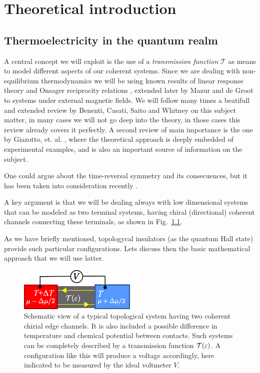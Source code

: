\chapter{Theoretical introduction}
\label{ch:theory}

\section{Thermoelectricity in the quantum realm}
\label{sec:teo:teoThermoQH}

A central concept we will exploit is the use of a \textit{transmission function} $\mathcal{T}$ as means to model different aspects of our coherent systems. Since we are dealing with non-equilibrium thermodynamics we will be using known results of linear response theory and Onsager reciprocity relations \cite{onsager1931reciprocalI,onsager1931reciprocalII}, extended later by Mazur and de Groot \cite{mazur1953onsager} to systems under external magnetic fields. 
We will follow many times a beatifull and extended review by Benenti, Casati, Saito and Whitney \cite{benenti2017fundamental} on this subject matter, in many cases we will not go deep into the theory, in those cases this review already covers it perfectly. A second review of main importance is the one by Giazotto, et. al. \cite{Giazotto2006Mar}, where the theoretical approach is deeply embedded of experimental examples, and is also an important source of information on the subject.

One could argue about the time-reversal symmetry and its consecuences, but it has been taken into consideration recently \cite{luo2020onsager}.

A key argument is that we will be dealing always with low dimensional systems that can be modeled as two terminal systems, having chiral (directional) coherent channels connecting these terminals, as shown in Fig.~\ref{fig:teo:2terminal}. 

As we have briefly mentioned, topologycal insulators (as the quantum Hall state) provide such particular configurations. Lets discuss then the basic mathematical approach that we will use latter.

\begin{figure}
    \centering
    \includegraphics[width = 0.5\textwidth]{figures/theory/2-terminal.pdf}
    \caption{Schematic view of a typical topological system having two coherent chirial edge channels. It is also included a possible difference in temperature and chemical potential between contacts. Such systems can be completely described by a transmission function $\mathcal{T}(\varepsilon)$. A configuration like this will produce a voltage accordingly, here indicated to be measured by the ideal voltmeter $V$.}
    \label{fig:teo:2terminal}
\end{figure}


